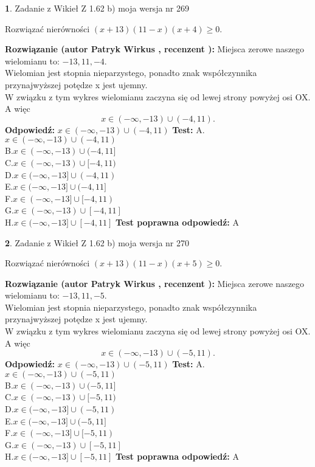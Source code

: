 \documentclass[12pt, a4paper]{article}
\theoremstyle{definition} %
\newtheorem{zad}{}
\newcommand{\zadStart}[1]{\begin{zad}#1\newline}
\newcommand{\zadStop}{\end{zad}}
\newcommand{\rozwStart}[2]{\noindent \textbf{Rozwiązanie (autor #1 , recenzent #2): }\newline}
\newcommand{\rozwStop}{\newline}
\newcommand{\odpStart}{\noindent \textbf{Odpowiedź:}\newline}
\newcommand{\odpStop}{\newline}
\newcommand{\testStart}{\noindent \textbf{Test:}\newline}
\newcommand{\testStop}{\newline}
\newcommand{\kluczStart}{\noindent \textbf{Test poprawna odpowiedź:}\newline}
\newcommand{\kluczStop}{\newline}
\begin{document}
\zadStart{Zadanie z Wikieł Z 1.62 b) moja wersja nr 269}

Rozwiązać nierówności $(x+13)(11-x)(x+4)\ge0$.
\zadStop
\rozwStart{Patryk Wirkus}{}
Miejsca zerowe naszego wielomianu to: $-13, 11, -4$.\\
Wielomian jest stopnia nieparzystego, ponadto znak współczynnika przy\linebreak najwyższej potędze x jest ujemny.\\ W związku z tym wykres wielomianu zaczyna się od lewej strony powyżej osi OX. A więc $$x \in (-\infty,-13) \cup (-4,11).$$
\rozwStop
\odpStart
$x \in (-\infty,-13) \cup (-4,11)$
\odpStop
\testStart
A.$x \in (-\infty,-13) \cup (-4,11)$\\
B.$x \in (-\infty,-13) \cup (-4,11]$\\
C.$x \in (-\infty,-13) \cup [-4,11)$\\
D.$x \in (-\infty,-13] \cup (-4,11)$\\
E.$x \in (-\infty,-13] \cup (-4,11]$\\
F.$x \in (-\infty,-13] \cup [-4,11)$\\
G.$x \in (-\infty,-13) \cup [-4,11]$\\
H.$x \in (-\infty,-13] \cup [-4,11]$
\testStop
\kluczStart
A
\kluczStop



\zadStart{Zadanie z Wikieł Z 1.62 b) moja wersja nr 270}

Rozwiązać nierówności $(x+13)(11-x)(x+5)\ge0$.
\zadStop
\rozwStart{Patryk Wirkus}{}
Miejsca zerowe naszego wielomianu to: $-13, 11, -5$.\\
Wielomian jest stopnia nieparzystego, ponadto znak współczynnika przy\linebreak najwyższej potędze x jest ujemny.\\ W związku z tym wykres wielomianu zaczyna się od lewej strony powyżej osi OX. A więc $$x \in (-\infty,-13) \cup (-5,11).$$
\rozwStop
\odpStart
$x \in (-\infty,-13) \cup (-5,11)$
\odpStop
\testStart
A.$x \in (-\infty,-13) \cup (-5,11)$\\
B.$x \in (-\infty,-13) \cup (-5,11]$\\
C.$x \in (-\infty,-13) \cup [-5,11)$\\
D.$x \in (-\infty,-13] \cup (-5,11)$\\
E.$x \in (-\infty,-13] \cup (-5,11]$\\
F.$x \in (-\infty,-13] \cup [-5,11)$\\
G.$x \in (-\infty,-13) \cup [-5,11]$\\
H.$x \in (-\infty,-13] \cup [-5,11]$
\testStop
\kluczStart
A
\kluczStop
\end{document}
